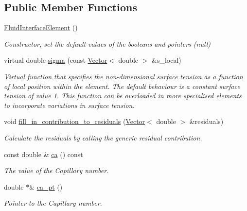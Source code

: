 \subsection*{Public Member Functions}
\begin{DoxyCompactItemize}
\item 
\hyperlink{classoomph_1_1FluidInterfaceElement_a4bd4a44ee08780fb8ba1be83c4353dd4}{Fluid\+Interface\+Element} ()
\begin{DoxyCompactList}\small\item\em Constructor, set the default values of the booleans and pointers (null) \end{DoxyCompactList}\item 
virtual double \hyperlink{classoomph_1_1FluidInterfaceElement_a7e5c3ca1eba5d4dd44c0eab9be252c2a}{sigma} (const \hyperlink{classoomph_1_1Vector}{Vector}$<$ double $>$ \&s\+\_\+local)
\begin{DoxyCompactList}\small\item\em Virtual function that specifies the non-\/dimensional surface tension as a function of local position within the element. The default behaviour is a constant surface tension of value 1. This function can be overloaded in more specialised elements to incorporate variations in surface tension. \end{DoxyCompactList}\item 
void \hyperlink{classoomph_1_1FluidInterfaceElement_a3f66ffd5d9a8b9b6bd8cd54e90ce2d61}{fill\+\_\+in\+\_\+contribution\+\_\+to\+\_\+residuals} (\hyperlink{classoomph_1_1Vector}{Vector}$<$ double $>$ \&residuals)
\begin{DoxyCompactList}\small\item\em Calculate the residuals by calling the generic residual contribution. \end{DoxyCompactList}\item 
const double \& \hyperlink{classoomph_1_1FluidInterfaceElement_abcb18ff13b322136dd2346a6b40ecabc}{ca} () const
\begin{DoxyCompactList}\small\item\em The value of the Capillary number. \end{DoxyCompactList}\item 
double $\ast$\& \hyperlink{classoomph_1_1FluidInterfaceElement_a1a950f0202d6dd15fab2f0c03927edc9}{ca\+\_\+pt} ()
\begin{DoxyCompactList}\small\item\em Pointer to the Capillary number. \end{DoxyCompactList}\item 

\end{DoxyCompactItemize}
